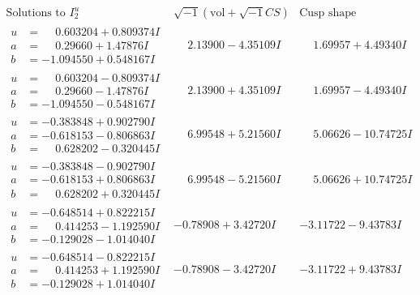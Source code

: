\documentclass[1p]{elsarticle_modified}
\theoremstyle{definition}
\newcommand{\I}{\sqrt{-1}}
\begin{document}
$$\begin{array}{c|c|c}  
\text{Solutions to }I^u_{2}& \I (\text{vol} + \sqrt{-1}CS) & \text{Cusp shape}\\
 \hline 
\begin{aligned}
u &= \phantom{-}0.603204 + 0.809374 I \\
a &= \phantom{-}0.29660 + 1.47876 I \\
b &= -1.094550 + 0.548167 I\end{aligned}
 & \phantom{-}2.13900 - 4.35109 I & \phantom{-}1.69957 + 4.49340 I \\ \hline\begin{aligned}
u &= \phantom{-}0.603204 - 0.809374 I \\
a &= \phantom{-}0.29660 - 1.47876 I \\
b &= -1.094550 - 0.548167 I\end{aligned}
 & \phantom{-}2.13900 + 4.35109 I & \phantom{-}1.69957 - 4.49340 I \\ \hline\begin{aligned}
u &= -0.383848 + 0.902790 I \\
a &= -0.618153 - 0.806863 I \\
b &= \phantom{-}0.628202 - 0.320445 I\end{aligned}
 & \phantom{-}6.99548 + 5.21560 I & \phantom{-}5.06626 - 10.74725 I \\ \hline\begin{aligned}
u &= -0.383848 - 0.902790 I \\
a &= -0.618153 + 0.806863 I \\
b &= \phantom{-}0.628202 + 0.320445 I\end{aligned}
 & \phantom{-}6.99548 - 5.21560 I & \phantom{-}5.06626 + 10.74725 I \\ \hline\begin{aligned}
u &= -0.648514 + 0.822215 I \\
a &= \phantom{-}0.414253 - 1.192590 I \\
b &= -0.129028 - 1.014040 I\end{aligned}
 & -0.78908 + 3.42720 I & -3.11722 - 9.43783 I \\ \hline\begin{aligned}
u &= -0.648514 - 0.822215 I \\
a &= \phantom{-}0.414253 + 1.192590 I \\
b &= -0.129028 + 1.014040 I\end{aligned}
 & -0.78908 - 3.42720 I & -3.11722 + 9.43783 I \\ \hline\begin{aligned}

\end{aligned}
\end{array}$$
\end{document}
